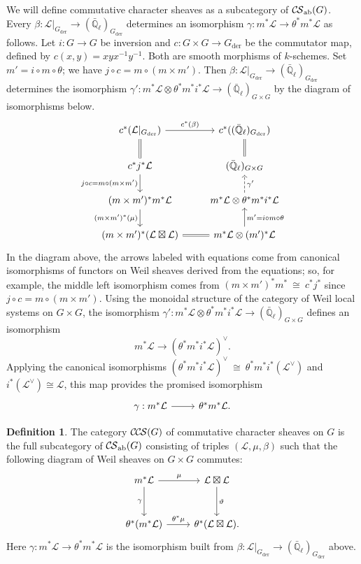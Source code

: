 \documentclass[10pt]{amsart}
\theoremstyle{plain}
\theoremstyle{definition}
\newtheorem{definition}[theorem]{Definition}
\newcommand{\EE}{\mathbb{\bar Q}_\ell}
\newcommand{\Fq}{k}
\newcommand{\der}{_{\operatorname{der}}}
\newcommand{\iso}{{\ \cong\ }}
\newcommand{\cs}[1]{{\mathcal{#1}}}
\newcommand{\CS}{{\mathcal{C\hskip-0.8pt S}}}
\newcommand{\CCS}{{\mathcal{C\hskip-.8pt C\hskip-0.8pt S}}}
\newcommand{\CSab}{\CS_{\operatorname{ab}}}
\begin{document}
%
We will define commutative character sheaves as a subcategory of $\CSab(G)$.
%
Every $\beta : \cs{L}\vert_{G\der} \to (\EE)_{G\der}$ determines an isomorphism $\gamma : m^*\cs{L} \to \theta^*m^*\cs{L}$ as follows.
Let $i : G \to G$ be inversion and $c : G\times G\to G\der$ be the commutator map, defined by $c(x,y)= xyx^{-1}y^{-1}$.
Both are smooth morphisms of $\Fq$-schemes.
Set $m' = i \circ m \circ \theta$; we have $j\circ c = m \circ (m \times m')$.
Then $\beta : \cs{L}\vert_{G\der} \to (\EE)_{G\der}$ determines the isomorphism $\gamma' : m^*\cs{L} \otimes \theta^* m^* i^*\cs{L} \to (\EE)_{G\times G}$ by the diagram of isomorphisms below.
\begin{equation}
\begin{tikzcd}
\arrow[equal]{d} c^* (\cs{L}\vert_{G\der}) \arrow{r}{c^*(\beta)} 
	&  c^*((\EE)_{G\der}) \arrow[equal]{d} \\
\arrow{d}[swap]{j\circ c = m \circ (m \times m')} c^* j^* \cs{L} 
	&   (\EE)_{G\times G} \\
(m \times m')^* m^* \cs{L} \arrow{d}[swap]{(m \times m')^*(\mu)} 
	&  m^*\cs{L} \otimes \theta^* m^* i^* \cs{L}  \arrow[dashed]{u}[swap]{\gamma'} \\
(m \times m')^* (\cs{L} \boxtimes \cs{L}) \arrow[equal]{r} 
	& m^*\cs{L} \otimes (m')^*\cs{L} \arrow{u}[swap]{m' = i\circ m\circ \theta} 
\end{tikzcd}
\end{equation}
In the diagram above, the arrows labeled with equations come from canonical isomorphisms of functors on Weil sheaves derived from the equations; so, for example, the middle left isomorphism comes from $(m\times m')^* m^* \iso c^* j^*$ since $j\circ c = m \circ (m \times m')$.
Using the monoidal structure of the category of Weil local systems on $G\times G$, the isomorphism $\gamma' : m^*\cs{L} \otimes \theta^* m^* i^*\cs{L} \to (\EE)_{G\times G}$ defines an isomorphism
\[
m^*\cs{L} \to (\theta^* m^* i^*\cs{L})^\vee.
\]
Applying the canonical isomorphisms $(\theta^* m^* i^*\cs{L})^\vee \iso \theta^* m^* i^* (\cs{L}^\vee)$ and $i^*(\cs{L}^\vee) \cong \cs{L}$, this map provides the promised isomorphism
\[
\begin{tikzcd}
\gamma : m^*\cs{L} \arrow{r} & \theta^* m^* \cs{L}.
\end{tikzcd}
\]

\begin{definition}\label{def:CCS}
The category $\CCS(G)$ of commutative character sheaves on $G$ is the full subcategory of $\CSab(G)$ consisting of triples $(\cs{L},\mu,\beta)$ such that the following diagram of Weil sheaves on $G \times G$ commutes:
  \[
  \begin{tikzcd}[row sep=30]
   m^*\cs{L} \arrow{d}[swap]{\gamma} \arrow{r}{\mu} & \cs{L}\boxtimes\cs{L} \arrow{d}{\vartheta}\\
   \theta^*(m^*\cs{L}) \arrow{r}{{\theta}^*\mu} &  \theta^*(\cs{L}\boxtimes\cs{L}).
  \end{tikzcd}
  \]
Here $\gamma : m^*\cs{L} \to \theta^* m^* \cs{L}$ is the isomorphism built from $\beta : \cs{L}\vert_{G\der} \to (\EE)_{G\der}$ above. 
\end{definition}
\end{document}
